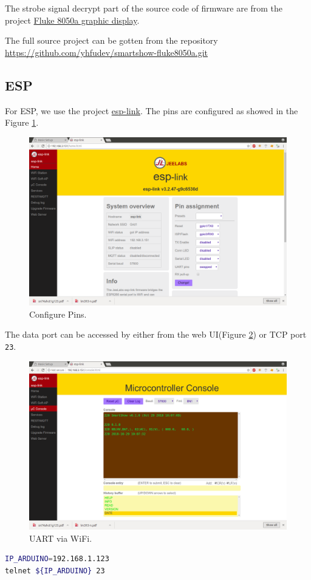 \documentclass[a4paper,10pt]{article}
\begin{document}
The strobe signal decrypt part of the source code of firmware are from the project
\href{http://vondervotteimittiss.com/belfry/?p=180}{Fluke 8050a graphic display}.


The full source project can be gotten from the repository \url{https://github.com/yhfudev/smartshow-fluke8050a.git}



\subsection{ESP}

For ESP, we use the project \href{https://github.com/jeelabs/esp-link.git}{esp-link}.
The pins are configured as showed in the Figure \ref{fig:smartshow-confwin}.

\begin{figure}[h!t] \centering
    \includegraphics[width=0.8\linewidth]{figures/smartshow-confwin.png}
    \caption{Configure Pins.} \label{fig:smartshow-confwin}
\end{figure}


The data port can be accessed by either from the web UI(Figure \ref{fig:smartshow-ctrlwin}) or TCP port \texttt{23}.
\begin{figure}[h!t] \centering
    \includegraphics[width=0.8\linewidth]{figures/smartshow-ctrlwin.png}
    \caption{UART via WiFi.} \label{fig:smartshow-ctrlwin}
\end{figure}
\begin{lstlisting}[language=bash]
IP_ARDUINO=192.168.1.123
telnet ${IP_ARDUINO} 23
\end{lstlisting}
\end{document}
